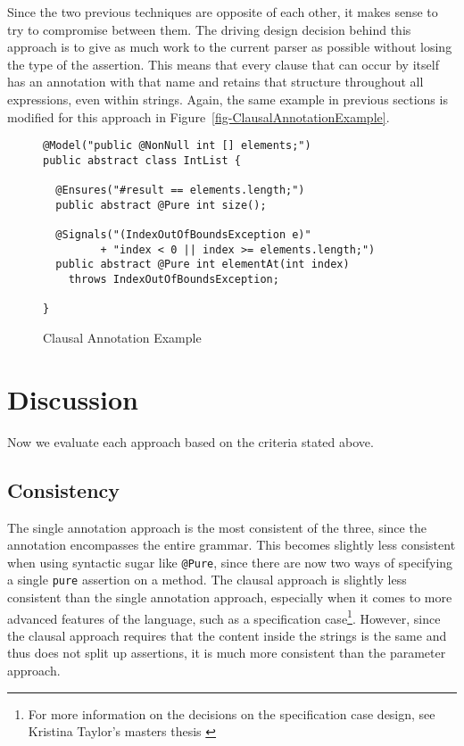 \documentclass{llncs}
\newcommand{\figref}[1]{Figure~\vref{#1}}
\begin{document}
Since the two previous techniques are opposite of each other, it makes sense to try to compromise between them.  The driving design decision behind this approach is to give as much work to the current parser as possible without losing the type of the assertion.  This means that every clause that can occur by itself has an annotation with that name and retains that structure throughout all expressions, even within strings.  Again, the same example in previous sections is modified for this approach in \figref{fig-ClausalAnnotationExample}.

\begin{figure}[ht]
\begin{lstlisting}[language={[JML5]Java}]
@Model("public @NonNull int [] elements;")
public abstract class IntList {

  @Ensures("#result == elements.length;")
  public abstract @Pure int size();
        
  @Signals("(IndexOutOfBoundsException e)"
         + "index < 0 || index >= elements.length;")
  public abstract @Pure int elementAt(int index) 
    throws IndexOutOfBoundsException;

}     
\end{lstlisting}
\caption{Clausal Annotation Example}
\label{fig-ClausalAnnotationExample}
\end{figure}

\section{Discussion}

Now we evaluate each approach based on the criteria stated above.

\subsection{Consistency}

The single annotation approach is the most consistent of the three, since the annotation encompasses the entire grammar.  This becomes slightly less consistent when using syntactic sugar like \lstinline[language={[JML5]Java}]{@Pure}, since there are now two ways of specifying a single \lstinline[language={[JML5]Java}]{pure} assertion on a method.  The clausal approach is slightly less consistent than the single annotation approach, especially when it comes to more advanced features of the language, such as a specification case\footnote{For more information on the decisions on the specification case design, see Kristina Taylor's masters thesis \cite{Taylor08}}.  However, since the clausal approach requires that the content inside the strings is the same and thus does not split up assertions, it is much more consistent than the parameter approach.
\end{document}

